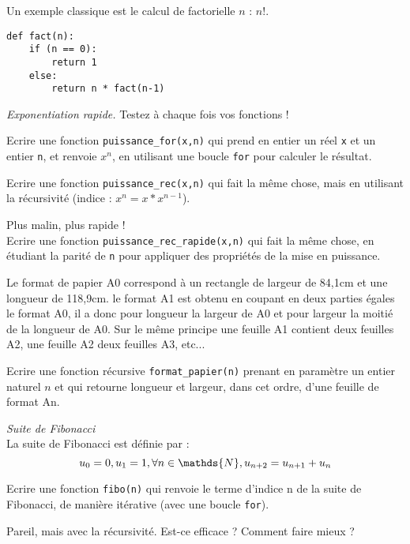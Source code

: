 


Un exemple classique est le calcul de factorielle $n$ : $n!$.
\begin{verbatim}
def fact(n):
	if (n == 0):
		return 1
	else:
		return n * fact(n-1)
\end{verbatim}

\exo

\textit{Exponentiation rapide.} Testez à chaque fois vos fonctions !

\ques Ecrire une fonction \verb!puissance_for(x,n)! qui prend en entier un réel \verb!x! et un entier \verb!n!, et renvoie $x^n$, en utilisant une boucle \verb!for! pour calculer le résultat.

\ques Ecrire une fonction \verb!puissance_rec(x,n)! qui fait la même chose, mais en utilisant la récursivité (indice : $x^n = x*x^{n-1}$).

\ques Plus malin, plus rapide !\\
Ecrire une fonction \verb!puissance_rec_rapide(x,n)! qui fait la même chose, en étudiant la parité de \verb!n! pour appliquer des propriétés de la mise en puissance.

\exo

Le format de papier A0 correspond à un rectangle de largeur de 84,1cm et une longueur de 118,9cm. le format A1 est obtenu en coupant en deux parties égales le format A0, il a donc pour longueur la largeur de A0 et pour largeur la moitié de la longueur de A0. Sur le même principe une feuille A1 contient deux feuilles A2, une feuille A2 deux feuilles A3, etc...

Ecrire une fonction récursive \verb!format_papier(n)! prenant en paramètre un entier naturel $n$ et qui retourne longueur et largeur, dans cet ordre, d'une feuille de format An.

\exo

\textit{Suite de Fibonacci}\\
La suite de Fibonacci est définie par :
\begin{equation*}
	u_0 = 0, \\
	u_1 = 1, \\
	\forall n \in \mathds{N}, u_{n+2} = u_{n+1} + u_{n}
\end{equation*}

\ques Ecrire une fonction \verb!fibo(n)! qui renvoie le terme d'indice n de la suite de Fibonacci, de manière itérative (avec une boucle \verb!for!).

\ques Pareil, mais avec la récursivité. Est-ce efficace ? Comment faire mieux ?
